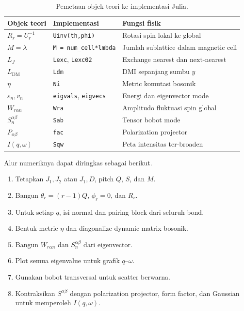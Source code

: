 \documentclass[11pt,a4paper]{article}
\begin{document}
\begin{table}[H]
\centering
\caption{Pemetaan objek teori ke implementasi Julia.}
\begin{tabular}{>{\raggedright\arraybackslash}p{}
                >{\raggedright\arraybackslash}p{}
                >{\raggedright\arraybackslash}p{}}
\toprule
Objek teori & Implementasi & Fungsi fisik\\
\midrule
$R_r=U_r^{-1}$ & \texttt{Uinv(th,phi)} & Rotasi spin lokal ke global\\
$M=\lambda$ & \texttt{M = num\_cell*lmbda} & Jumlah sublattice dalam magnetic cell\\
$L_J$ & \texttt{Lexc}, \texttt{Lexc02} & Exchange nearest dan next-nearest\\
$L_{\mathrm{DM}}$ & \texttt{Ldm} & DMI sepanjang sumbu $y$\\
$\eta$ & \texttt{Ni} & Metric komutasi bosonik\\
$\varepsilon_n,v_n$ & \texttt{eigvals}, \texttt{eigvecs} & Energi dan eigenvector mode\\
$W_{r\alpha n}$ & \texttt{Wra} & Amplitudo fluktuasi spin global\\
$S_n^{\alpha\beta}$ & \texttt{Sab} & Tensor bobot mode\\
$P_{\alpha\beta}$ & \texttt{fac} & Polarization projector\\
$I(q,\omega)$ & \texttt{Sqw} & Peta intensitas ter-broaden\\
\bottomrule
\end{tabular}
\end{table}

Alur numeriknya dapat diringkas sebagai berikut.
\begin{enumerate}
  \item Tetapkan $J_1,J_2$ atau $J_1,D$, pitch $Q$, $S$, dan $M$.
  \item Bangun $\theta_r=(r-1)Q$, $\phi_r=0$, dan $R_r$.
  \item Untuk setiap $q$, isi normal dan pairing block dari seluruh bond.
  \item Bentuk metric $\eta$ dan diagonalize dynamic matrix bosonik.
  \item Bangun $W_{r\alpha n}$ dan $S_n^{\alpha\beta}$ dari eigenvector.
  \item Plot semua eigenvalue untuk grafik $q$--$\omega$.
  \item Gunakan bobot transversal untuk scatter berwarna.
  \item Kontraksikan $S^{\alpha\beta}$ dengan polarization projector, form factor, dan Gaussian untuk memperoleh $I(q,\omega)$.
\end{enumerate}
\end{document}
